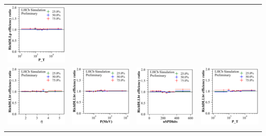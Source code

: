\documentclass[oneside]{book}
\begin{document}
\begin{tabular}{l@{\hskip -0.0in}c@{\hskip -0.0in}c@{\hskip -0.0in}c}
\includegraphics[width=0.32\linewidth]{eff_ratio_RichDLLp_vs_P_T_at_[0.05, 0.1, 0.25, 0.5, 0.75, 0.9, 0.95].pdf}\\
\vspace{-0.2cm}
\includegraphics[width=0.32\linewidth]{eff_ratio_RichDLLbt_vs_Brunel_ETA_at_[0.05, 0.1, 0.25, 0.5, 0.75, 0.9, 0.95].pdf} &
\includegraphics[width=0.32\linewidth]{eff_ratio_RichDLLbt_vs_Brunel_P_at_[0.05, 0.1, 0.25, 0.5, 0.75, 0.9, 0.95].pdf} &
\includegraphics[width=0.32\linewidth]{eff_ratio_RichDLLbt_vs_nSPDhits_at_[0.05, 0.1, 0.25, 0.5, 0.75, 0.9, 0.95].pdf} &
\includegraphics[width=0.32\linewidth]{eff_ratio_RichDLLbt_vs_P_T_at_[0.05, 0.1, 0.25, 0.5, 0.75, 0.9, 0.95].pdf}\\
\vspace{-0.2cm}
\end{tabular}
\end{document}
